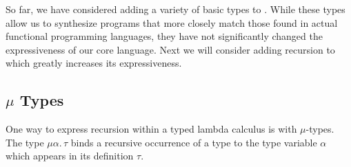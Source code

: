 So far, we have considered adding a variety of basic types to \lsyn{}.
While these types allow us to synthesize programs that more closely match those found in actual functional programming languages, they have not significantly changed the expressiveness of our core language.
Next we will consider adding recursion to \lsyn{} which greatly increases its expressiveness.

\subsection{\texorpdfstring{$μ$}{μ} Types}



One way to express recursion within a typed lambda calculus is with $μ$-types.
The type $μα.\,τ$ binds a recursive occurrence of a type to the type variable $α$ which appears in its definition $τ$.












